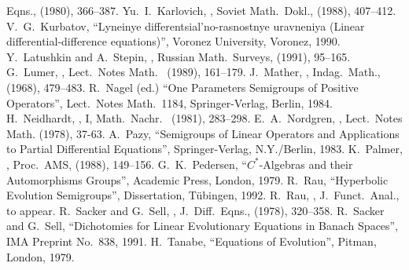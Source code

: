 \begin{thebibliography}{xx}
Eqns.,  (1980), 366--387.
 Yu.~I.~Karlovich, , Soviet Math.\ Dokl.,  (1988), 407--412.
 V.~G.~Kurbatov, ``Lyneinye differentsial'no-rasnostnye
uravneniya (Linear differential-difference equations)'', Voronez
University, Voronez, 1990.
 Y.~Latushkin and A.~Stepin, , Russian Math.\ Surveys,
 (1991), 95--165.
 G.~Lumer, ,
Lect.\ Notes Math.~ (1989), 161--179.
 J.~Mather, ,
Indag.\ Math.,  (1968), 479--483.
 R.~Nagel (ed.) ``One Parameters Semigroups of Positive
Operators'', Lect.\ Notes Math.~1184, Springer-Verlag, Berlin, 1984.
 H.~Neidhardt, ,
I, Math.\ Nachr.~ (1981), 283--298.
 E.~A.~Nordgren, , Lect.\ Notes Math.  (1978), 37-63.
 A.~Pazy, ``Semigroups of Linear Operators and Applications to
Partial Differential Equations'', Springer-Verlag, N.Y./Berlin, 1983.
 K.~Palmer, ,
Proc.\ AMS,  (1988), 149--156.
 G.~K.~Pedersen, ``$C^*$-Algebras and their Automorphisms
Groups'', Academic Press, London, 1979.
 R.~Rau, ``Hyperbolic Evolution Semigroups'', Dissertation, T\"
ubingen, 1992.
 R.~Rau, , J.~Funct.\ Anal., to appear.
 R.~Sacker and G.~Sell, , J.~Diff.\ Eqns.,  (1978), 320--358.
 R.~Sacker and G.~Sell, ``Dichotomies for Linear Evolutionary
Equations in Banach Spaces'', IMA Preprint No.~838, 1991.
 H.~Tanabe, ``Equations of Evolution'', Pitman, London, 1979.
\end{thebibliography}




